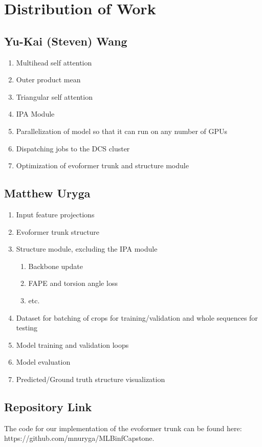 \documentclass[11pt]{article}
\newcommand{\np}{\newpage}
\begin{document}
\section{Distribution of Work}
\subsection{Yu-Kai (Steven) Wang}
\begin{enumerate}[label=(\alph*)]
	\item Multihead self attention
	\item Outer product mean
	\item Triangular self attention
	\item IPA Module
	\item Parallelization of model so that it can run on any number of GPUs
	\item Dispatching jobs to the DCS cluster
	\item Optimization of evoformer trunk and structure module
\end{enumerate}

\subsection{Matthew Uryga}
\begin{enumerate}[label=(\alph*)]
	\item Input feature projections
	\item Evoformer trunk structure
	\item Structure module, excluding the IPA module
	\begin{enumerate}[label=(\roman*)]
		\item Backbone update
		\item FAPE and torsion angle loss
		\item etc.
	\end{enumerate}
	\item Dataset for batching of crops for training/validation and whole sequences for testing
	\item Model training and validation loops
	\item Model evaluation
	\item Predicted/Ground truth structure visualization
\end{enumerate}

\subsection{Repository Link}
The code for our implementation of the evoformer trunk can be found here:\\https://github.com/mnuryga/MLBinfCapstone.
\np
\end{document}

